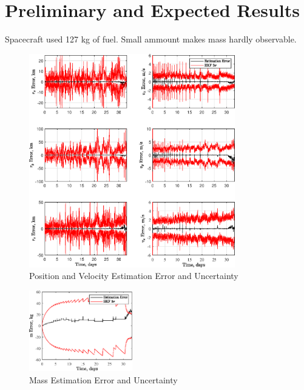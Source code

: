 \documentclass[letterpaper, submit]{AAS}			%
\begin{document}
\section{Preliminary and Expected Results}
Spacecraft used 127 kg of fuel. Small ammount makes mass hardly observable.

\begin{figure}[hbt!]
	\centering
	\includegraphics[width=0.8\textwidth]{./../../figures/EKFPosVelError.eps}
	\caption{Position and Velocity Estimation Error and Uncertainty}
	\label{fig:posvel_err}
\end{figure}
\begin{figure}[hbt!]
	\centering
	\includegraphics[width=0.4\textwidth]{./../../figures/EKFMass.eps}
	\caption{Mass Estimation Error and Uncertainty}
	\label{fig:mass_err}
\end{figure}


\end{document}
